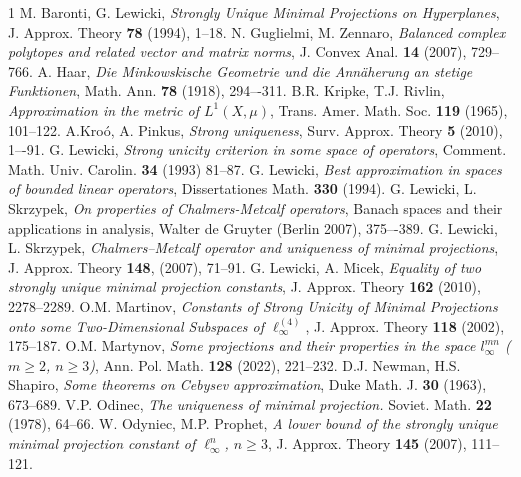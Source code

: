 \documentclass[12pt, reqno]{amsart}
\theoremstyle{definition}
\theoremstyle{remark}
\numberwithin{equation}{section}
\begin{document}
\begin{thebibliography}{1}
 M. Baronti, G. Lewicki, \emph{Strongly Unique Minimal Projections on Hyperplanes}, J. Approx. Theory \textbf{78} (1994), 1--18.
 N. Guglielmi, M. Zennaro, \emph{Balanced complex polytopes and related vector and matrix norms}, J. Convex Anal. \textbf{14} (2007), 729--766.
 A. Haar, \emph{Die Minkowskische Geometrie und die Ann\"aherung an stetige Funktionen}, Math. Ann. \textbf{78} (1918), 294–-311.
 B.R. Kripke, T.J. Rivlin, \emph{Approximation in the metric of $L^1(X, \mu)$}, Trans. Amer. Math. Soc. \textbf{119} (1965), 101--122.
 A.Kroó, A. Pinkus, \emph{Strong uniqueness}, Surv. Approx. Theory \textbf{5} (2010), 1–-91.
 G. Lewicki, \emph{Strong unicity criterion in some space of operators}, Comment. Math. Univ. Carolin. \textbf{34} (1993) 81--87.
 G. Lewicki, \emph{Best approximation in spaces of bounded linear operators}, Dissertationes Math. \textbf{330} (1994).
 G. Lewicki, L. Skrzypek, \emph{On properties of Chalmers-Metcalf operators}, Banach spaces and their applications in analysis, Walter de Gruyter (Berlin 2007), 375–-389.
 G. Lewicki, L. Skrzypek, \emph{Chalmers–Metcalf operator and uniqueness of minimal projections}, J. Approx. Theory \textbf{148}, (2007), 71--91.
 G. Lewicki, A. Micek, \emph{Equality of two strongly unique minimal projection constants}, J. Approx. Theory \textbf{162} (2010), 2278--2289.
 O.M. Martinov, \emph{Constants of Strong Unicity of Minimal Projections onto some Two-Dimensional Subspaces of $\ell_{\infty}^{(4)}$}, J. Approx. Theory \textbf{118} (2002), 175--187.
 O.M. Martynov, \emph{Some projections and their properties in the space $l^{mn}_{\infty }$ ($m\geq 2$, $n\geq 3$)}, Ann. Pol. Math. \textbf{128} (2022), 221--232.
 D.J. Newman, H.S. Shapiro, \emph{Some theorems on Cebysev approximation}, Duke Math. J. \textbf{30} (1963), 673--689.
 V.P. Odinec, \emph{The uniqueness of minimal projection.} Soviet. Math. \textbf{22} (1978), 64--66.
 W. Odyniec, M.P. Prophet, \emph{A lower bound of the strongly unique minimal projection constant of $\ell_{\infty}^n$, $n \geq 3$}, J. Approx. Theory \textbf{145} (2007), 111--121.

\end{thebibliography}
\end{document}
